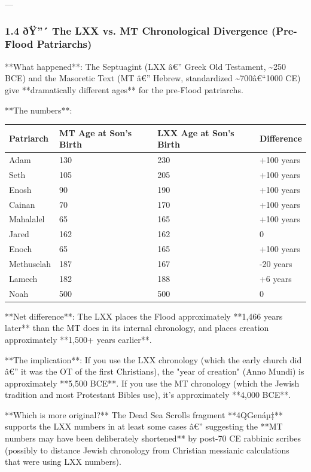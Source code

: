 \documentclass[aps,prd,11pt,onecolumn,superscriptaddress,nofootinbib,floatfix]{revtex4-2}
\begin{document}
---


\subsubsection{1.4 ðŸ''´ The LXX vs. MT Chronological Divergence (Pre-Flood Patriarchs)}


**What happened**: The Septuagint (LXX â€'' Greek Old Testament, \textasciitilde{}250 BCE) and the Masoretic Text (MT â€'' Hebrew, standardized \textasciitilde{}700â€``1000 CE) give **dramatically different ages** for the pre-Flood patriarchs.


**The numbers**:


\begin{table}[h!]
\centering
\begin{tabular}{p{3cm}p{3cm}p{3cm}p{3cm}}
\hline
Patriarch & MT Age at Son's Birth & LXX Age at Son's Birth & Difference \\
\hline
Adam & 130 & 230 & +100 years \\
Seth & 105 & 205 & +100 years \\
Enosh & 90 & 190 & +100 years \\
Cainan & 70 & 170 & +100 years \\
Mahalalel & 65 & 165 & +100 years \\
Jared & 162 & 162 & 0 \\
Enoch & 65 & 165 & +100 years \\
Methuselah & 187 & 167 & -20 years \\
Lamech & 182 & 188 & +6 years \\
Noah & 500 & 500 & 0 \\
\hline
\end{tabular}
\end{table}



**Net difference**: The LXX places the Flood approximately **1,466 years later** than the MT does in its internal chronology, and places creation approximately **1,500+ years earlier**.


**The implication**: If you use the LXX chronology (which the early church did â€'' it was the OT of the first Christians), the "year of creation" (Anno Mundi) is approximately **5,500 BCE**. If you use the MT chronology (which the Jewish tradition and most Protestant Bibles use), it's approximately **4,000 BCE**.


**Which is more original?** The Dead Sea Scrolls fragment **4QGenáµ‡** supports the LXX numbers in at least some cases â€'' suggesting the **MT numbers may have been deliberately shortened** by post-70 CE rabbinic scribes (possibly to distance Jewish chronology from Christian messianic calculations that were using LXX numbers).
\end{document}

